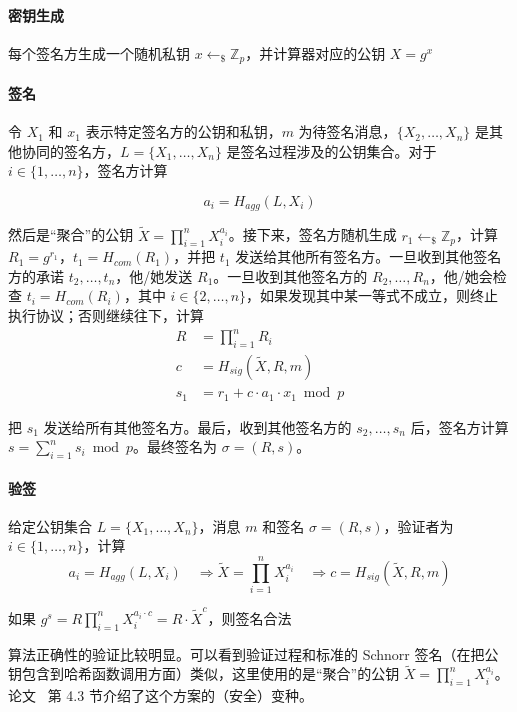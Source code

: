 \documentclass[a4paper,10pt]{article}
\begin{document}
\paragraph{密钥生成}
每个签名方生成一个随机私钥 \(x\leftarrow_{\$} \mathbb{Z}_p\)，并计算器对应的公钥 \(X=g^x\)

\paragraph{签名}
令 \(X_1\) 和 \(x_1\) 表示特定签名方的公钥和私钥，\(m\) 为待签名消息，\(\{X_2,\dots,X_n\}\) 是其他协同的签名方，\(L=\{X_1,\dots,X_n\}\) 是签名过程涉及的公钥集合。对于 \(i\in\{1,\dots,n\}\)，签名方计算

\[ a_i=H_{agg}(L,X_i) \]

然后是“聚合”的公钥 \(\tilde{X}=\prod_{i=1}^nX_i^{a_i}\)。接下来，签名方随机生成 \(r_1\leftarrow_{\$} \mathbb{Z}_p\)，计算
\(R_1=g^{r_1}\)，\(t_1=H_{com}(R_1)\)，并把 \(t_1\) 发送给其他所有签名方。一旦收到其他签名方的承诺 \(t_2,\dots,t_n\)，他/她发送
\(R_1\)。一旦收到其他签名方的 \(R_2,\dots,R_n\)，他/她会检查 \(t_i=H_{com}(R_i)\)，其中 \(i\in\{2,\dots,n\}\)，如果发现其中某一等式不成立，则终止执行协议；否则继续往下，计算
\begin{align*}
  R &=\prod_{i=1}^n R_i \\
  c &= H_{sig}(\tilde{X},R,m) \\
  s_1 &= r_1+c\cdot a_1\cdot x_1 \bmod p
\end{align*}

把 \(s_1\) 发送给所有其他签名方。最后，收到其他签名方的 \(s_2,\dots,s_n\) 后，签名方计算 \(s=\sum_{i=1}^n s_i \bmod p\)。最终签名为 \(\sigma=(R,s)\)。

\paragraph{验签}
给定公钥集合 \(L=\{X_1,\dots,X_n\}\)，消息 \(m\) 和签名 \(\sigma=(R,s)\)，验证者为 \(i\in\{1,\dots,n\}\)，计算
\[ 
a_i=H_{agg}(L,X_i)\quad \Rightarrow \tilde{X}=\prod_{i=1}^n X_i^{a_i}\quad \Rightarrow c=H_{sig}(\tilde{X},R,m)
\]

如果 \(g^s=R\prod_{i=1}^n X_i^{a_i\cdot c}=R\cdot \tilde{X}^c\)，则签名合法

算法正确性的验证比较明显。可以看到验证过程和标准的 Schnorr 签名（在把公钥包含到哈希函数调用方面）类似，这里使用的是“聚合”的公钥 \(\tilde{X}=\prod_{i=1}^n X_i^{a_i}\)。论文~\cite{2019Simple} 第 4.3 节介绍了这个方案的（安全）变种。
\end{document}
